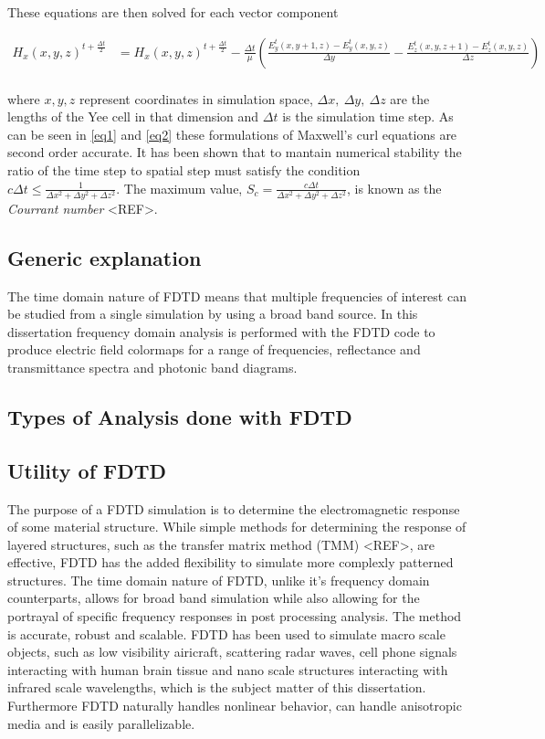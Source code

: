 \documentclass[./JimHeneghanDissertation.tex]{subfiles}
\begin{document}
			These equations are then solved for each vector component

			\begin{equation} \label{eq2}
			\begin{split}
				H_{x}(x,y,z)^{t+\frac{\Delta t}{2}}  &= H_{x}(x,y,z)^{t+\frac{\Delta t}{2}} -\frac{\Delta t}{\mu} (\frac{E_{y}^{t}(x,y+1,z) - E_{y}^{t}(x,y,z)}{\Delta y} - \frac{E_{z}^{t}(x,y,z+1) -E_{z}^{t}(x,y,z)}{\Delta z})\\
			\end{split}
			\end{equation}

			where $x, y, z$ represent coordinates in simulation space, $\Delta x, \ \Delta y, \ \Delta z$ are the lengths of the Yee cell in that dimension and $\Delta t$ is the simulation time step. As can be seen in \eqref{eq1} and \eqref{eq2} these formulations of Maxwell's curl equations are second order accurate. It has been shown that to mantain numerical stability the ratio of the time step to spatial step must satisfy the condition $c \Delta t \leq \frac{1}{\Delta x^{2} + \Delta y^{2} + \Delta z^{2}}$. The maximum value, $S_{c} = \frac{c \Delta t}{\Delta x^{2} + \Delta y^{2} + \Delta z^{2}}$, is known as the \textit{Courrant number} <REF>.

			\subsection{Generic explanation}
				The time domain nature of FDTD means that multiple frequencies of interest can be studied from a single simulation by using a broad band source. In this dissertation frequency domain analysis is performed with the FDTD code to produce electric field colormaps for a range of frequencies, reflectance and transmittance spectra and photonic band diagrams. 
			\subsection{Types of Analysis done with FDTD}
			\subsection{Utility of FDTD}
				The purpose of a FDTD simulation is to determine the electromagnetic response of some material structure. While simple methods for determining the response of layered structures, such as the transfer matrix method (TMM) <REF>, are effective, FDTD has the added flexibility to simulate more complexly patterned structures. The time domain nature of FDTD, unlike it's frequency domain counterparts, allows for broad band simulation while also allowing for the portrayal of specific frequency responses in post processing analysis. The method is accurate, robust and scalable. FDTD has been used to simulate macro scale objects, such as low visibility airicraft, scattering radar waves, cell phone signals interacting with human brain tissue and nano scale structures interacting with infrared scale wavelengths, which is the subject matter of this dissertation. Furthermore FDTD naturally handles nonlinear behavior, can handle anisotropic media and is easily parallelizable.
\end{document}
